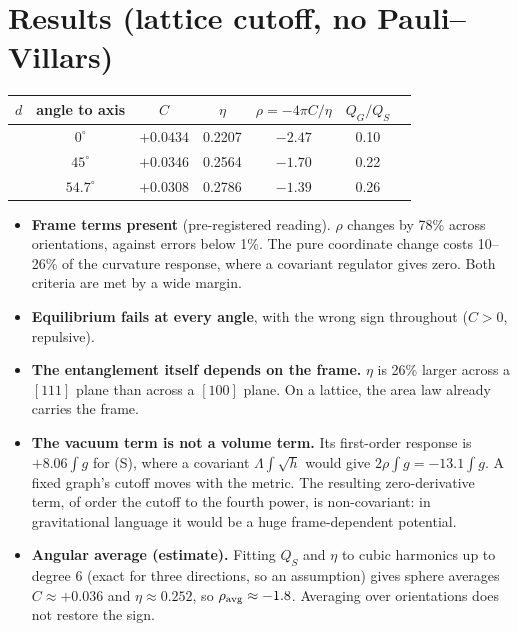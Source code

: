 \documentclass[11pt]{article}
\begin{document}
\section{Results (lattice cutoff, no Pauli--Villars)}
\begin{center}\begin{tabular}{lcccccc}\toprule
$d$ & angle to axis & $C$ & $\eta$ & $\rho=-4\pi C/\eta$ & $Q_G/Q_S$\\\midrule
[100] & $0^\circ$ & $+0.0434$ & 0.2207 & $-2.47$ & 0.10\\
[110] & $45^\circ$ & $+0.0346$ & 0.2564 & $-1.70$ & 0.22\\
[111] & $54.7^\circ$ & $+0.0308$ & 0.2786 & $-1.39$ & 0.26\\\bottomrule
\end{tabular}\end{center}
\begin{itemize}
\item \textbf{Frame terms present} (pre-registered reading). $\rho$ changes by 78\% across orientations, against errors below 1\%. The pure coordinate change costs 10--26\% of the curvature response, where a covariant regulator gives zero. Both criteria are met by a wide margin.
\item \textbf{Equilibrium fails at every angle}, with the wrong sign throughout ($C>0$, repulsive).
\item \textbf{The entanglement itself depends on the frame.} $\eta$ is 26\% larger across a $[111]$ plane than across a $[100]$ plane. On a lattice, the area law already carries the frame.
\item \textbf{The vacuum term is not a volume term.} Its first-order response is $+8.06\!\int\!g$ for (S), where a covariant $\Lambda\!\int\!\sqrt h$ would give $2\rho\!\int\!g=-13.1\!\int\!g$. A fixed graph's cutoff moves with the metric. The resulting zero-derivative term, of order the cutoff to the fourth power, is non-covariant: in gravitational language it would be a huge frame-dependent potential.
\item \textbf{Angular average (estimate).} Fitting $Q_S$ and $\eta$ to cubic harmonics up to degree 6 (exact for three directions, so an assumption) gives sphere averages $C\approx+0.036$ and $\eta\approx0.252$, so $\rho_{\rm avg}\approx-1.8$. Averaging over orientations does not restore the sign.
\end{itemize}
\end{document}
